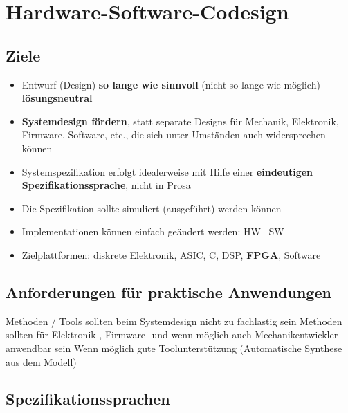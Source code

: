 \section{Hardware-Software-Codesign}

\subsection{Ziele}

\begin{itemize}
    \item Entwurf (Design) \textbf{so lange wie sinnvoll} (nicht so lange wie möglich) \textbf{lösungsneutral}
    \item \textbf{Systemdesign fördern}, statt separate Designs für Mechanik, Elektronik, Firmware, Software, etc., die sich
        unter Umständen auch widersprechen können
    \item Systemspezifikation erfolgt idealerweise mit Hilfe einer \textbf{eindeutigen Spezifikationssprache}, nicht in
        Prosa
    \item Die Spezifikation sollte simuliert (ausgeführt) werden können
    \item Implementationen können einfach geändert werden: HW \textlrarrow\ SW
    \item Zielplattformen: diskrete Elektronik, ASIC, \textmu C, DSP, \textbf{FPGA}, Software
\end{itemize}


\subsection{Anforderungen für praktische Anwendungen}

\begin{outline}
    \1 Methoden / Tools sollten beim Systemdesign nicht zu fachlastig sein
        \2 Methoden sollten für Elektronik-, Firmware- und wenn möglich auch Mechanikentwickler anwendbar sein
    \1 Wenn möglich gute Toolunterstützung
    \1 (Automatische Synthese aus dem Modell)
\end{outline}


\subsection{Spezifikationssprachen}

